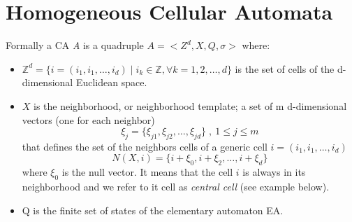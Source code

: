\section{Homogeneous Cellular Automata}\label{homogeneousCellularAutomata}
Formally a CA \emph{A} is a quadruple \begin{math} A=<Z^d,X,Q,\sigma>\end{math}
where:
\begin{itemize}
  \item \begin{math}\mathbb{Z}^d=\{i=(i_1,i_1,\ldots,i_d)\mid i_k \in
  \mathbb{Z}, \forall k=1,2,\ldots,d \}\end{math} is the set of cells of the d-dimensional
   Euclidean space.
  \item \begin{math}X\end{math} is the neighborhood, or neighborhood template; a
  set of m d-dimensional vectors (one for each neighbor)
  \[\xi_j=\{\xi_{j1},\xi_{j2},\ldots,\xi_{jd}\} \;,\: 1\leq j \leq m\] that
  defines the set of the neighbors cells of a generic cell
  \begin{math}i=(i_1,i_1,\ldots,i_d)\end{math}
  \[
  N(X,i)=\{i+\xi_0,i+\xi_2,\ldots,i+\xi_d\}
  \] where \begin{math}\xi_0\end{math} is the null vector. It means that the
  cell \begin{math}i\end{math} is always in its neighborhood and we refer to it
  cell as \emph{central cell}  (see example below).
\item Q is the finite set of states of the elementary automaton EA.
  

\end{itemize}
